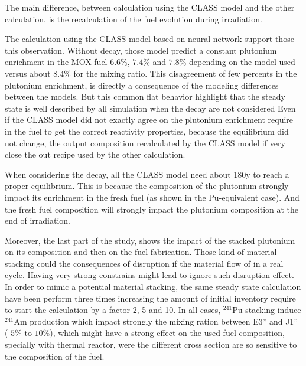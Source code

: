 \documentclass[12pt]{article}
\begin{document}
The main difference, between calculation using the CLASS model and the other
calculation, is the recalculation of the fuel evolution during irradiation. 

The calculation using the CLASS model based on neural network support those this
observation. Without decay, those model predict a constant plutonium enrichment
in the MOX fuel $6.6\%$, $7.4\%$ and $7.8\%$ depending on the model used versus
about $8.4\%$ for the mixing ratio. This disagreement of few percents in the
plutonium enrichment, is directly a consequence of the modeling differences
between the models.  But this common flat behavior highlight that the steady
state is well described by all simulation when the decay are not considered
Even if the CLASS model did not exactly agree on the plutonium enrichment
require in the fuel to get the correct reactivity properties, because the
equilibrium did not change, the output composition recalculated by the CLASS
model if very close the out recipe used by the other calculation.

When considering the decay, all the CLASS model need about 180y to reach a
proper equilibrium. This is because the composition of the plutonium
strongly impact its enrichment in the fresh fuel (as shown in the Pu-equivalent
case). And the fresh fuel composition will strongly impact the plutonium
composition at the end of irradiation. 

Moreover, the last part of the study, shows the impact of the stacked plutonium
on its composition and then on the fuel fabrication. Those kind of material
stacking could the consequences of disruption if the material flow of in a real
cycle. Having very strong constrains might lead to ignore such disruption
effect. In order to mimic a potential material stacking, the same steady state
calculation have been perform three times increasing the amount of initial
inventory require to start the calculation by a factor 2, 5 and 10. In all
cases, $^{241}$Pu stacking induce $^{241}$Am production which impact strongly
the mixing ration between E3'' and J1'' ( $5\%$ to $10\%$), which might have a
strong effect on the used fuel composition, specially with thermal reactor, were
the different cross section are so sensitive to the composition of the fuel.








\end{document}
